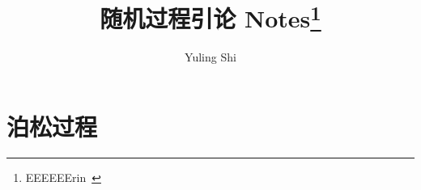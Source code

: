 \documentclass[10pt]{yerbaformat}
\title{随机过程引论 Notes\footnote{EEEEEErin~}}
\date{}
\begin{document}
\author{Yuling Shi}
\footnotesize





\section{泊松过程}
\end{document}
